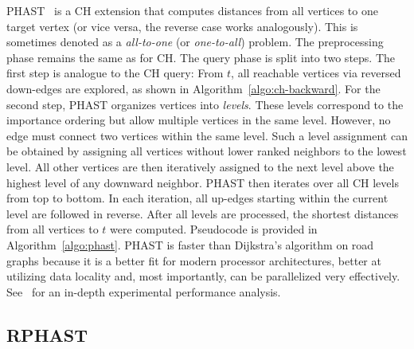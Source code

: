 \documentclass[manuscript,review]{acmart}
\begin{document}
PHAST~\cite{dgnw-phast-13} is a CH extension that computes distances from all vertices to one target vertex (or vice versa, the reverse case works analogously).
This is sometimes denoted as a \emph{all-to-one} (or \emph{one-to-all}) problem.
The preprocessing phase remains the same as for CH.
The query phase is split into two steps.
The first step is analogue to the CH query:
From $t$, all reachable vertices via reversed down-edges are explored, as shown in Algorithm~\ref{algo:ch-backward}.
For the second step, PHAST organizes vertices into \emph{levels}.
These levels correspond to the importance ordering but allow multiple vertices in the same level.
However, no edge must connect two vertices within the same level.
Such a level assignment can be obtained by assigning all vertices without lower ranked neighbors to the lowest level.
All other vertices are then iteratively assigned to the next level above the highest level of any downward neighbor.
PHAST then iterates over all CH levels from top to bottom.
In each iteration, all up-edges starting within the current level are followed in reverse.
After all levels are processed, the shortest distances from all vertices to $t$ were computed.
Pseudocode is provided in Algorithm~\ref{algo:phast}.
PHAST is faster than Dijkstra's algorithm on road graphs because it is a better fit for modern processor architectures, better at utilizing data locality and, most importantly, can be parallelized very effectively.
See~\cite{dgnw-phast-13} for an in-depth experimental performance analysis.


\subsection{RPHAST}
\end{document}
